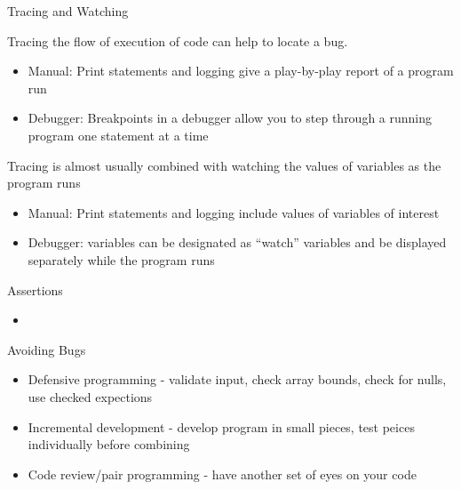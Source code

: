 \documentclass{beamer}
\begin{document}
\begin{frame}[fragile]{Tracing and Watching}


Tracing the flow of execution of code can help to locate a bug.
\begin{itemize}
\item Manual: Print statements and logging give a play-by-play report of a program run
\item Debugger: Breakpoints in a debugger allow you to step through a running program one statement at a time
\end{itemize}

Tracing is almost usually combined with watching the values of variables as the program runs
\begin{itemize}
\item Manual: Print statements and logging include values of variables of interest
\item Debugger: variables can be designated as ``watch'' variables and be displayed separately while the program runs
\end{itemize}


\end{frame}

\begin{frame}[fragile]{Assertions}


\begin{itemize}
\item
\end{itemize}

\end{frame}

\begin{frame}[fragile]{Avoiding Bugs}

\begin{itemize}
\item Defensive programming - validate input, check array bounds, check for nulls, use checked expections
\item Incremental development - develop program in small pieces, test peices individually before combining
\item Code review/pair programming - have another set of eyes on your code
\end{itemize}

\end{frame}









\end{document}
